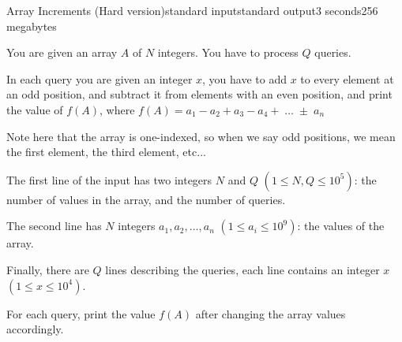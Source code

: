 \begin{problem}{Array Increments (Hard version)}{standard input}{standard output}{3 seconds}{256 megabytes}

You are given an array $A$ of $N$ integers. You have to process $Q$ queries.

In each query you are given an integer $x$, you have to add $x$ to every element at an odd position, and subtract it from elements with an even position, and print the value of $f(A)$, where $f(A) = a_1 - a_2 + a_3 - a_4 +\; \dots \; \pm \; a_n$

Note here that the array is one-indexed, so when we say odd positions, we mean the first element, the third element, etc...

\InputFile
The first line of the input has two integers $N$ and $Q$ $(1 \leq N, Q \leq 10^5)$: the number of values in the array, and the number of queries.

The second line has $N$ integers $a_1, a_2, \dots, a_n$ $(1 \leq a_i \leq 10^9)$: the values of the array.


Finally, there are $Q$ lines describing the queries, each line contains an integer $x$ $(1 \leq x \leq 10^4)$.

\OutputFile
For each query, print the value $f(A)$ after changing the array values accordingly.

\Example

\begin{example}
%
\end{example}

\end{problem}

